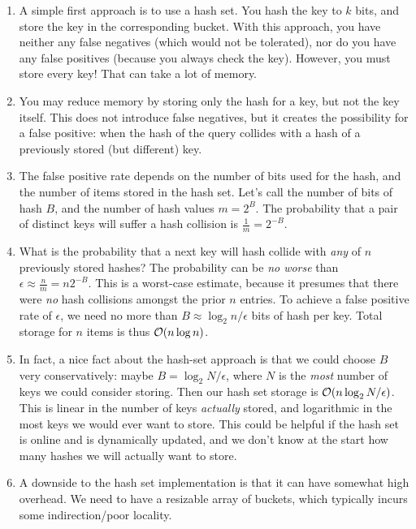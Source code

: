 \documentclass[11pt, oneside]{amsart}
\begin{document}
\begin{enumerate}

\item A simple first approach is to use a hash set. You hash the key to
$k$ bits, and store the key in the corresponding bucket. With this
approach, you have neither any false negatives (which would not be
tolerated), nor do you have any false positives (because you always
check the key). However, you must store every key! That can take a lot
of memory.

\item You may reduce memory by storing only the hash for a key, but not
the key itself. This does not introduce false negatives, but it creates
the possibility for a false positive: when the hash of the query
collides with a hash of a previously stored (but different) key.

\item The false positive rate depends on the number of bits used for the
hash, and the number of items stored in the hash set. Let's call the
number of bits of hash $B$, and the number of hash values $m = 2^B$. The
probability that a pair of distinct keys will suffer a hash collision is
$\frac{1}{m} = 2^{-B}$.

\item What is the probability that a next key will hash collide with
\emph{any} of $n$ previously stored hashes? The probability can be
\emph{no worse} than $\epsilon \approx \frac{n}{m} = n 2^{-B}$. This is
a worst-case estimate, because it presumes that there were \emph{no}
hash collisions amongst the prior $n$ entries. To achieve a false
positive rate of $\epsilon$, we need no more than  $B \approx
\log_2{n/\epsilon}$ bits of hash per key. Total storage for $n$ items is
thus $\mathcal{O}(n \log n)$.

\item In fact, a nice fact about the hash-set approach is that we could
choose $B$ very conservatively: maybe $B = \log_2 N / \epsilon$, where
$N$ is the \emph{most} number of keys we could consider storing. Then
our hash set storage is $\mathcal{O}(n \log_2 N / \epsilon)$. This is linear
in the number of keys \emph{actually} stored, and logarithmic in the
most keys we would ever want to store. This could be helpful if the hash
set is online and is dynamically updated, and we don't know at the start
how many hashes we will actually want to store.

\item A downside to the hash set implementation is that it can have
somewhat high overhead. We need to have a resizable array of buckets,
which typically incurs some indirection/poor locality.

\end{enumerate}
\end{document}
